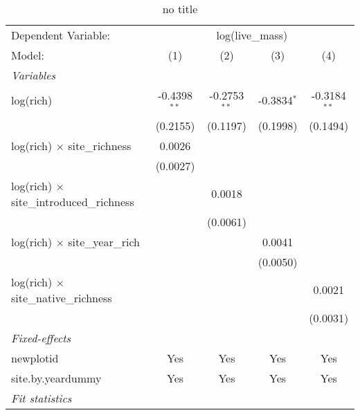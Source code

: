 
\begin{table}[htbp]
   \caption{no title}
   \centering
   \begin{tabular}{lcccc}
      \tabularnewline \midrule \midrule
      Dependent Variable: & \multicolumn{4}{c}{log(live\_mass)}\\
      Model:                                           & (1)            & (2)            & (3)           & (4)\\  
      \midrule
      \emph{Variables}\\
      log(rich)                                        & -0.4398$^{**}$ & -0.2753$^{**}$ & -0.3834$^{*}$ & -0.3184$^{**}$\\   
                                                       & (0.2155)       & (0.1197)       & (0.1998)      & (0.1494)\\   
      log(rich) $\times$ site\_richness                & 0.0026         &                &               &   \\   
                                                       & (0.0027)       &                &               &   \\   
      log(rich) $\times$ site\_introduced\_richness    &                & 0.0018         &               &   \\   
                                                       &                & (0.0061)       &               &   \\   
      log(rich) $\times$ site\_year\_rich              &                &                & 0.0041        &   \\   
                                                       &                &                & (0.0050)      &   \\   
      log(rich) $\times$ site\_native\_richness        &                &                &               & 0.0021\\   
                                                       &                &                &               & (0.0031)\\   
      \midrule
      \emph{Fixed-effects}\\
      newplotid                                        & Yes            & Yes            & Yes           & Yes\\  
      site.by.yeardummy                                & Yes            & Yes            & Yes           & Yes\\  
      \midrule
      \emph{Fit statistics}\\

\end{tabular}
\end{table}
